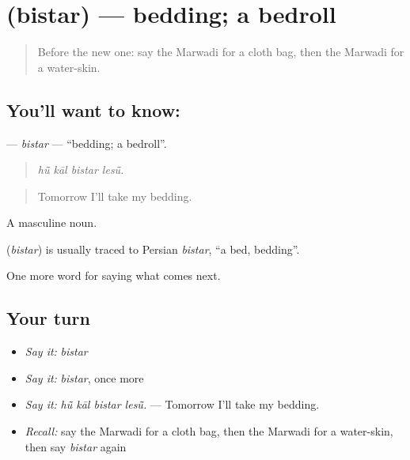 \section[\texorpdfstring{\mw{बिस्तर} (bistar)}{बिस्तर (bistar)}]{ (bistar) — bedding; a bedroll}

\label{lesson:MW-C225-bistar}



\begin{quote}
Before the new one: say the Marwadi for a cloth bag, then the Marwadi for a water-skin.
\end{quote}

\subsection*{You'll want to know: }
\textbf{} — \emph{bistar} — \textquotedblleft{}bedding; a bedroll\textquotedblright{}.

\begin{quote}
   
\end{quote}

\begin{quote}
\emph{hū̃ kāl bistar lesū̃.}
\end{quote}

\begin{quote}
Tomorrow I'll take my bedding.
\end{quote}

A masculine noun.

\begin{cousinweb}
\textbf{} (\emph{bistar}) is usually traced to Persian \emph{bistar}, \textquotedblleft{}a bed, bedding\textquotedblright{}.
\end{cousinweb}

\begin{grammarlens}[title={What you've built}]
One more word for saying what comes next.
\end{grammarlens}

\subsection*{Your turn}
\begin{itemize}
\raggedright
  \item \emph{Say it:} \emph{bistar}
  \item \emph{Say it:} \emph{bistar}, once more
  \item \emph{Say it:} \emph{hū̃ kāl bistar lesū̃.} — Tomorrow I'll take my bedding.
  \item \emph{Recall:} say the Marwadi for a cloth bag, then the Marwadi for a water-skin, then say \emph{bistar} again
\end{itemize}

